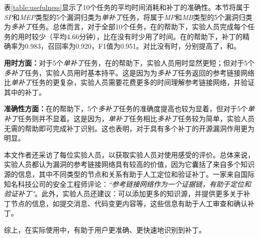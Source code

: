 表\ref{table:usefulness}显示了10个任务的平均时间消耗和补丁的准确性。本节将属于\textit{SP}和\textit{MEP}类型的5个漏洞归类为\textit{单补丁}任务，将属于\textit{MP}和\textit{MB}类型的5个漏洞归类为\textit{多补丁}任务。总体而言，对于全部10个任务，在\tool 的帮助下，实验人员完成每个任务的用时较少（平均4.66分钟），比在没有\tool 时少用了时间。在\tool 的帮助下，补丁的精确率为0.983，召回率为0.920，F1值为0.951。对比没有\tool 时，分别提高了，和。

\textbf{用时方面：}对于5个\textit{单补丁}任务，在\tool 的帮助下，实验人员用时显然更短；但对于5个\textit{多补丁}任务，实验人员用时基本持平。这是因为\tool 为\textit{多补丁}任务返回的参考链接网络比\textit{单补丁}任务的更复杂，实验人员需要花费更多的时间理解参考链接网络，并验证其中的补丁。

\textbf{准确性方面：}在\tool 的帮助下，5个\textit{多补丁}任务的准确度提高也较为显着，但对于5个\textit{单补丁}任务则并不显着。这是因为，\textit{单补丁}任务相比\textit{多补丁}任务较为简单，实验人员无需\tool 的帮助即可完成补丁识别。这也表明，\tool 对于具有多个补丁的开源漏洞作用更为明显。

本文作者还采访了每位实验人员，以获取实验人员对\tool 使用感受的评价。总体来说，实验人员都认为漏洞的参考链接网络具有较高的价值，因为它囊括了来自多个知识源的信息，其中不同类型的节点和关系有助于人工定位和验证补丁。一家来自国际知名科技公司的安全工程师评论：\textit{``参考链接网络作为一个证据链，有助于定位和验证补丁"}。此外，实验人员还建议：\tool 可以添加更多的知识源，并提供更多关于补丁节点的信息，如提交消息、代码变更内容等，这些信息有助于人工审查和确认补丁。

综上，在实际使用中，\tool 有助于用户更准确、更快速地识别到补丁。

